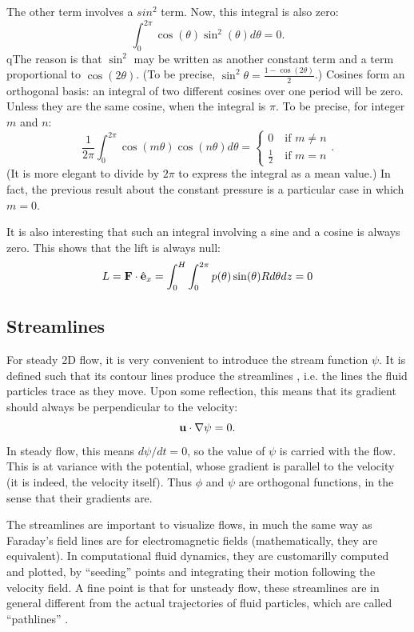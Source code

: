 The other term involves a $sin^2$ term. Now, this integral is also
zero:
\[
 \int_0^{2\pi}  \cos(\theta)  \sin^2(\theta) d\theta = 0 .
\]
qThe reason is that $\sin^2$ may be written as another constant term
and a term proportional to $\cos(2\theta)$. (To be precise,
$\sin^{2}\theta ={\frac {1-\cos(2\theta )}{2}}$.) Cosines form an
orthogonal basis: an integral of two different cosines over one period
will be zero. Unless they are the same cosine, when the integral is
$\pi$. To be precise, for integer $m$ and $n$:
\[
\frac{1}{2\pi} \int_0^{2\pi}  \cos(m \theta) \cos(n \theta)  d\theta = 
\begin{cases}
0 \quad \text{if } m\ne n \\
\frac12 \quad \text{if } m = n 
\end{cases} .
\]
(It is more elegant to divide by $2\pi$ to express the integral as a
mean value.) In fact, the previous result about the constant pressure
is a particular case in which $m=0$.

It is also interesting that such an integral involving a sine and a
cosine is always zero. This shows that the lift is always null:
\[
L= \mathbf{F} \cdot \hat{\mathbf{e}}_x = \int_0^H \int_0^{2\pi}
p(\theta) \sin(\theta) R d\theta dz = 0
\]



\subsection{Streamlines}

For steady 2D flow, it is very convenient to introduce the stream
function $\psi$. It is defined such that its contour lines produce the
streamlines , i.e. the lines the fluid particles
trace as they move. Upon some reflection, this means that its gradient
should always be perpendicular to the velocity:
\begin{equation}
  \label{eq:stream_perp_to_u}
  \mathbf{u} \cdot \nabla\psi = 0 .
\end{equation}
In steady flow, this means $d\psi/dt=0$, so the value of $\psi$ is
carried with the flow. This is at variance with the potential, whose
gradient is parallel to the velocity (it is indeed, the velocity
itself). Thus $\phi$ and $\psi$ are orthogonal functions, in the sense
that their gradients are.

The streamlines are important to visualize flows, in much the same way
as Faraday's field lines are for electromagnetic fields
(mathematically, they are equivalent). In computational fluid
dynamics, they are customarilly computed and plotted, by ``seeding''
points and integrating their motion following the velocity field.  A
fine point is that for unsteady flow, these streamlines are in general
different from the actual trajectories of fluid particles, which are
called ``pathlines'' .


